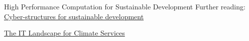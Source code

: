 \begin{frame}{High Performance Computation for Sustainable Development}
Further reading:\\ 
\href{https://medium.com/birdhouse-newsletter/cyber-structures-for-sustainable-development-74b3e4deeff1}{Cyber-structures for sustainable development} 

\href{https://medium.com/birdhouse-newsletter/the-it-landscape-for-climate-services-4e21c32c4ffb}{The IT Landscape for Climate Services} 

\end{frame}
